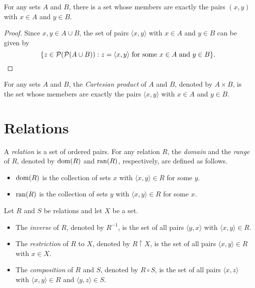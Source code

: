 \begin{theorem}
  For any sets $A$ and $B$, there is a set whose members are exactly the
  pairs $(x, y)$ with $x \in A$ and $y \in B$.
\end{theorem}
\begin{proof}
  Since $x, y \in A \cup B$, the set of pairs $\langle x, y \rangle$ with
  $x \in A$ and $y \in B$ can be given by
  \begin{equation*}
    \{z \in \mathcal{P}(\mathcal{P}(A \cup B)):
    \text{$z = \langle x, y \rangle$ for some $x \in A$ and $y \in B$}\}.
    \qedhere
  \end{equation*}
\end{proof}

\begin{definition}
  For any sets $A$ and $B$, the \emph{Cartesian product} of $A$ and $B$,
  denoted by $A \times B$, is the set whose memebers are exactly the pairs
  $\langle x, y \rangle$ with $x \in A$ and $y \in B$.
\end{definition}

\section{Relations}
\begin{definition}
  A \emph{relation} is a set of ordered pairs.
  For any relation $R$, the \emph{domain} and the \emph{range} of $R$, denoted
  by $\operatorname{dom}(R)$ and $\operatorname{ran}(R)$, respectively, are defined as follows.
  \begin{itemize}
    \item $\operatorname{dom}(R)$ is the collection of sets $x$ with
    $\langle x, y \rangle \in R$ for some $y$.
    \item $\operatorname{ran}(R)$ is the collection of sets $y$ with
    $\langle x, y \rangle \in R$ for some $x$.
  \end{itemize}
\end{definition}

\begin{definition}
  Let $R$ and $S$ be relations and let $X$ be a set.
  \begin{itemize}
    \item The \emph{inverse} of $R$, denoted by $R^{-1}$, is the set of all
    pairs $\langle y, x \rangle$ with $\langle x, y \rangle \in R$.
    \item The \emph{restriction} of $R$ to $X$, denoted by
    $R \upharpoonright X$, is the set of all pairs $\langle x, y \rangle \in R$
    with $x \in X$.
    \item The \emph{composition} of $R$ and $S$, denoted by $R \circ S$, is the
    set of all pairs $\langle x, z \rangle$ with $\langle x, y \rangle \in R$
    and $\langle y, z \rangle \in S$.
  \end{itemize}
\end{definition}


